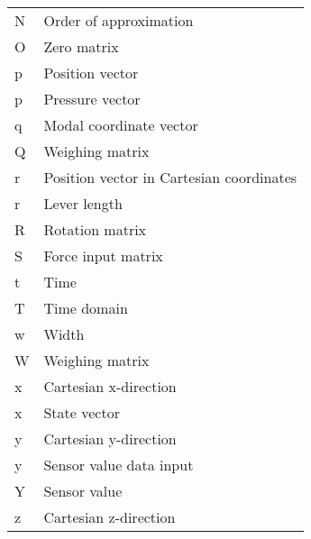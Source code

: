 \begin{spacing}{0.9}
\begin{multicols}{2}
\begin{table}[H]
\begin{tabular}{p{1.5cm} p{5cm}}
    N     & Order of approximation \\
    O     &  Zero matrix \\
    p     & Position vector \\
    p     & Pressure vector \\
    q     & Modal coordinate vector \\
    Q     & Weighing matrix \\
    r     & Position vector in Cartesian coordinates \\
    r     & Lever length \\
    R     & Rotation matrix \\
    S     & Force input matrix \\
    t     & Time \\
    T     & Time domain \\
    w     & Width \\
    W     & Weighing matrix \\
    x     & Cartesian x-direction \\
    x     & State vector \\
    y     & Cartesian y-direction \\
    y     & Sensor value data input \\
    Y     & Sensor value \\
    z     & Cartesian z-direction \\ \hline
    \end{tabular}
\end{table}



\end{multicols}
\end{spacing}
